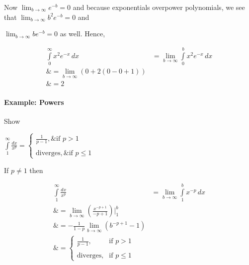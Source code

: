 Now $\lim _{b\to\infty}e^{-b}=0$ and because exponentials overpower polynomials, we see that $\lim _{b\to\infty}b^2e^{-b}=0$ and

$\lim _{b\to\infty}be^{-b}=0$ as well. Hence,



\begin{align}
\int\limits _0^\infty x^2e^{-x}\,dx 

&= \lim _{b\to\infty}\int\limits _0^b x^2e^{-x}\,dx \\\&= \lim _{b\to\infty} \left( 0 + 2(0 - 0 + 1) \right) \\\&= 2
\end{align}





\paragraph{Example: Powers}



Show

$\int\limits _1^\infty\frac{dx}{x^p}=

\begin{cases}

\frac{1}{p-1},\& \text{if }p > 1 \\\\ \text{diverges}, \& \text{if }p \le 1

\end{cases}$



If $p\ne 1$ then



\begin{align}
\int\limits _1^\infty \frac{dx}{x^p} 

&= \lim _{b\to\infty}\int\limits _1^b x^{-p}\,dx \\\&= \lim _{b\to\infty}\left(\frac{x^{-p+1}}{-p+1}\right)\Bigg| _1^b \\\&= -\frac{1}{1-p}\lim _{b\to\infty}\left(b^{-p+1} - 1\right) \\\&= \begin{cases} 

\frac{1}{p-1}, & \text{if } p > 1 \\\\ 

\text{diverges}, & \text{if } p \leq 1 

\end{cases}
\end{align}






